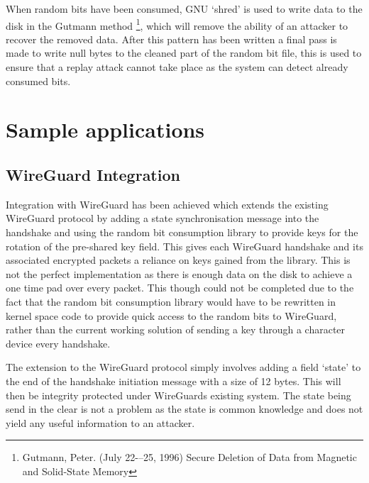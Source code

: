 \documentclass{paper}
\begin{document}
			When random bits have been consumed, GNU `shred' is used to write data to the disk in the Gutmann method \footnote{Gutmann, Peter. (July 22-–25, 1996) Secure Deletion of Data from Magnetic and Solid-State Memory}, which will remove the ability of an attacker to recover the removed data. After this pattern has been written a final pass is made to write null bytes to the cleaned part of the random bit file, this is used to ensure that a replay attack cannot take place as the system can detect already consumed bits.
			
		\section{Sample applications}
			\subsection{WireGuard Integration}
				Integration with WireGuard has been achieved which extends the existing WireGuard protocol by adding a state synchronisation message into the handshake and using the random bit consumption library to provide keys for the rotation of the pre-shared key field. This gives each WireGuard handshake and its associated encrypted packets a reliance on keys gained from the library. This is not the perfect implementation as there is enough data on the disk to achieve a one time pad over every packet. This though could not be completed due to the fact that the random bit consumption library would have to be rewritten in kernel space code to provide quick access to the random bits to WireGuard, rather than the current working solution of sending a key through a character device every handshake.
				
				The extension to the WireGuard protocol simply involves adding a field `state' to the end of the handshake initiation message with a size of 12 bytes. This will then be integrity protected under WireGuards existing system. The state being send in the clear is not a problem as the state is common knowledge and does not yield any useful information to an attacker.
				
\end{document}
